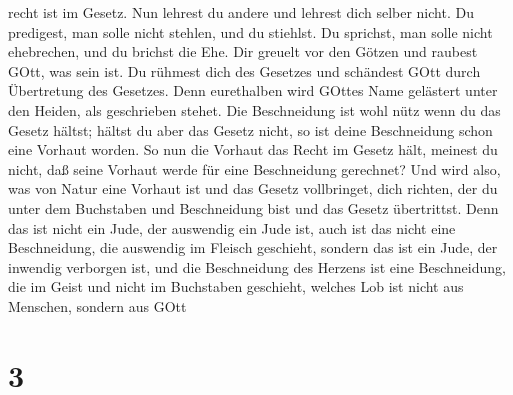 recht ist im Gesetz.  Nun lehrest du andere und lehrest
dich selber nicht. Du predigest, man solle nicht stehlen, und du
stiehlst.  Du sprichst, man solle nicht ehebrechen, und du
brichst die Ehe. Dir greuelt vor den Götzen und raubest GOtt, was sein
ist.  Du rühmest dich des Gesetzes und schändest GOtt durch
Übertretung des Gesetzes.  Denn eurethalben wird GOttes
Name gelästert unter den Heiden, als geschrieben stehet. 
Die Beschneidung ist wohl nütz wenn du das Gesetz hältst; hältst du aber
das Gesetz nicht, so ist deine Beschneidung schon eine Vorhaut worden.
 So nun die Vorhaut das Recht im Gesetz hält, meinest du
nicht, daß seine Vorhaut werde für eine Beschneidung gerechnet?
 Und wird also, was von Natur eine Vorhaut ist und das
Gesetz vollbringet, dich richten, der du unter dem Buchstaben und
Beschneidung bist und das Gesetz übertrittst.  Denn das ist
nicht ein Jude, der auswendig ein Jude ist, auch ist das nicht eine
Beschneidung, die auswendig im Fleisch geschieht,  sondern
das ist ein Jude, der inwendig verborgen ist, und die Beschneidung des
Herzens ist eine Beschneidung, die im Geist und nicht im Buchstaben
geschieht, welches Lob ist nicht aus Menschen, sondern aus GOtt

\hypertarget{section-2}{%
\section{3}\label{section-2}}

